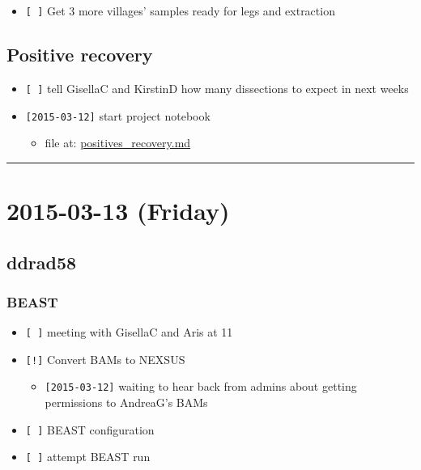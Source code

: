 \documentclass[letterpaper]{scrartcl}
\begin{document}
\begin{itemize}
\itemsep1pt\parskip0pt
\item
  \texttt{{[} {]}} Get 3 more villages' samples ready for legs and
  extraction
\end{itemize}

\subsection{Positive recovery}\label{positive-recovery}

\begin{itemize}
\itemsep1pt\parskip0pt
\item
  \texttt{{[} {]}} tell GisellaC and KirstinD how many dissections to
  expect in next weeks
\item
  \texttt{{[}2015-03-12{]}} start project notebook

  \begin{itemize}
  \itemsep1pt\parskip0pt
  \item
    file at:
    \href{file:///home/gus/Dropbox/repos/git/markdown-docs/notes/projects/positives_recovery/positives_recovery.md}{positives\_recovery.md}
  \end{itemize}
\end{itemize}

\begin{center}\rule{0.5\linewidth}{\linethickness}\end{center}

\section{2015-03-13 (Friday)}\label{friday-1}

\subsection{ddrad58}\label{ddrad58-3}

\subsubsection{BEAST}\label{beast-1}

\begin{itemize}
\itemsep1pt\parskip0pt
\item
  \texttt{{[} {]}} meeting with GisellaC and Aris at 11
\item
  \texttt{{[}!{]}} Convert BAMs to NEXSUS

  \begin{itemize}
  \itemsep1pt\parskip0pt
  \item
    \texttt{{[}2015-03-12{]}} waiting to hear back from admins about
    getting permissions to AndreaG's BAMs
  \end{itemize}
\item
  \texttt{{[} {]}} BEAST configuration
\item
  \texttt{{[} {]}} attempt BEAST run
\end{itemize}
\end{document}
